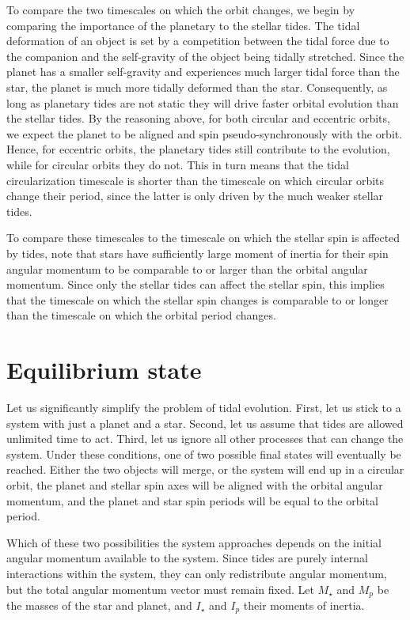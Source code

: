 To compare the two timescales on which the orbit changes, we begin by comparing
the importance of the planetary to the stellar tides. The tidal deformation of
an object is set by a competition between the tidal force due to the companion
and the self-gravity of the object being tidally stretched. Since the planet has
a smaller self-gravity and experiences much larger tidal force than the star,
the planet is much more tidally deformed than the star. Consequently, as long as
planetary tides are not static they will drive faster orbital evolution than the
stellar tides. By the reasoning above, for both circular and eccentric orbits,
we expect the planet to be aligned and spin pseudo-synchronously with the orbit.
Hence, for eccentric orbits, the planetary tides still contribute to the
evolution, while for circular orbits they do not. This in turn means that the
tidal circularization timescale is shorter than the timescale on which circular
orbits change their period, since the latter is only driven by the much weaker
stellar tides.

To compare these timescales to the timescale on which the stellar spin is
affected by tides, note that stars have sufficiently large moment of inertia
for their spin angular momentum to be comparable to or larger than the orbital
angular momentum. Since only the stellar tides can affect the stellar spin, this
implies that the timescale on which the stellar spin changes is comparable to or
longer than the timescale on which the orbital period changes.

\section{Equilibrium state}
%
\label{sec:equilibrium}

Let us significantly simplify the problem of tidal evolution. First, let us
stick to a system with just a planet and a star. Second, let us assume that
tides are allowed unlimited time to act. Third, let us ignore all other
processes that can change the system. Under these conditions, one of two
possible final states will eventually be reached. Either the two objects will
merge, or the system will end up in a circular orbit, the planet and stellar
spin axes will be aligned with the orbital angular momentum, and the planet and
star spin periods will be equal to the orbital period.

Which of these two possibilities the system approaches depends on the initial
angular momentum available to the system. Since tides are purely internal
interactions within the system, they can only redistribute angular momentum, but
the total angular momentum vector must remain fixed. Let $M_\star$ and $M_p$ be
the masses of the star and planet, and $I_\star$ and $I_p$ their moments of
inertia.

